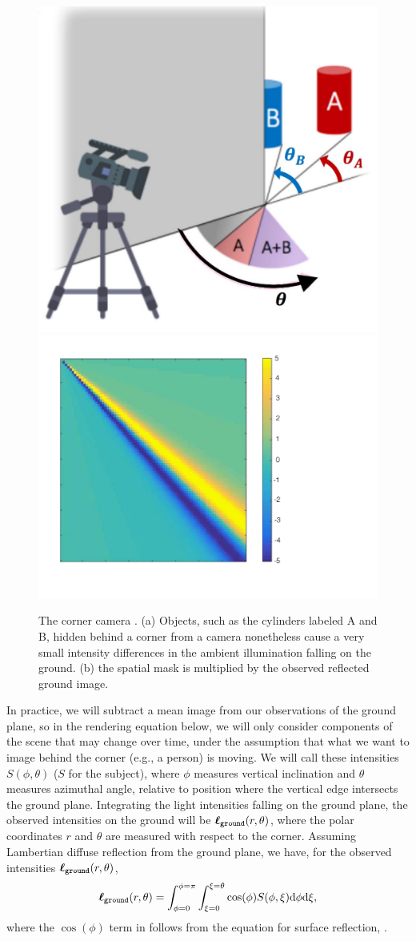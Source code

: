 \begin{figure}[t]
\centerline{
{\includegraphics[width=0.4\linewidth]{figures/imaging/cornercam.pdf}}
{\includegraphics[width=0.4\linewidth]{figures/imaging/cornerKey.pdf}}}
\caption{The corner camera \cite{Bouman17}.  (a) Objects, such as the cylinders labeled A and B, hidden behind a corner from a camera nonetheless cause a very small intensity differences in the ambient illumination falling on the ground.
(b) the spatial mask is multiplied by the observed reflected ground image.}
\label{fig:ccmodel}
\end{figure}


In practice, we will subtract a mean image from our observations of the ground plane, so in the rendering equation below, we will only consider components of
the scene that may change over time, under the assumption that what we want to image behind the corner (e.g., a person) is moving.  We will call these intensities
$S(\phi, \theta)$ ($S$ for the subject), where $\phi$ measures
vertical inclination and $\theta$ measures azimuthal angle, relative to position where the vertical edge intersects the ground plane.  Integrating the light intensities falling on the ground plane, the
observed intensities on the ground will be $\boldsymbol\ell_{\texttt{ground}} (r, \theta)$, where the
polar coordinates $r$ and $\theta$ are measured with respect to the corner.
Assuming Lambertian diffuse reflection from the ground plane, we have, for the observed intensities $\boldsymbol\ell_{\texttt{ground}} (r, \theta)$,
\begin{equation}
 \boldsymbol\ell_{\texttt{ground}} (r, \theta) = \int_{\phi=0}^{\phi=\pi} \int_{\xi=0}^{\xi=\theta}
 \cos(\phi) S(\phi, \xi) \mbox{d} \phi \mbox{d} \xi,
\label{eq:corner}
\end{equation}
where the $\cos(\phi)$ term in \eqn{\ref{eq:corner}} follows from the equation for surface reflection, \eqn{\ref{eq:lambert}}.




